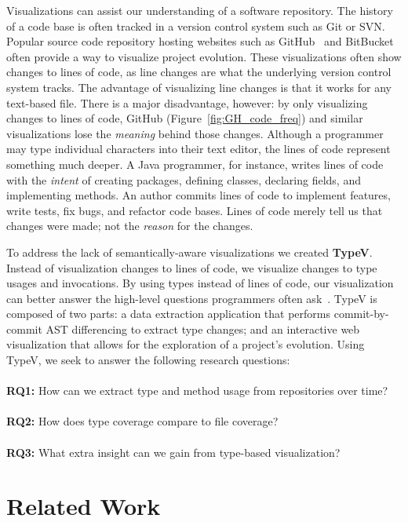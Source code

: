 Visualizations can assist our understanding of a software repository. The history of a code base is often tracked in a version control system such as Git or SVN. Popular source code repository hosting websites such as GitHub~\cite{github-graphs} and BitBucket~\cite{bitbucket-graphs} often provide a way to visualize project evolution. These visualizations often show changes to lines of code, as line changes are what the underlying version control system tracks. The advantage of visualizing line changes is that it works for any text-based file. There is a major disadvantage, however: by only visualizing changes to lines of code, GitHub (Figure~\ref{fig:GH_code_freq}) and similar visualizations lose the \emph{meaning} behind those changes. Although a programmer may type individual characters into their text editor, the lines of code represent something much deeper. A Java programmer, for instance, writes lines of code with the \emph{intent} of creating packages, defining classes, declaring fields, and implementing methods. An author commits lines of code to implement features, write tests, fix bugs, and refactor code bases. Lines of code merely tell us that changes were made; not the \emph{reason} for the changes. 

To address the lack of semantically-aware visualizations we created \textbf{TypeV}. Instead of visualization changes to lines of code, we visualize changes to type usages and invocations. By using types instead of lines of code, our visualization can better answer the high-level questions programmers often ask~\cite{sillito2006}. TypeV is composed of two parts: a data extraction application that performs commit-by-commit AST differencing to extract type changes; and an interactive web visualization that allows for the exploration of a project's evolution. Using TypeV, we seek to answer the following research questions:
  \\ \\
\textbf{RQ1:} How can we extract type and method usage from repositories over time?
  \\ \\
\textbf{RQ2:} How does type coverage compare to file coverage?
  \\ \\
\textbf{RQ3:} What extra insight can we gain from type-based visualization?


\section{Related Work}

